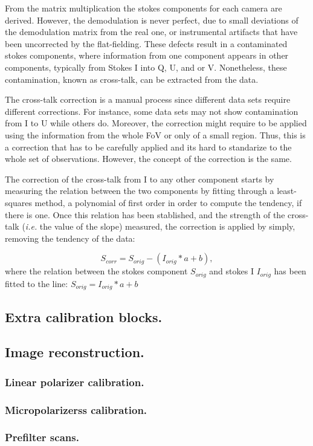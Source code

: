 From the matrix multiplication the stokes components for each camera are derived. However, the demodulation is never perfect, due to small deviations of the demodulation matrix from the real one, or instrumental artifacts that have been uncorrected by the flat-fielding. These defects result in a contaminated stokes components, where information from one component appears in other components, typically from Stokes I into Q, U, and or V. Nonetheless, these contamination, known as cross-talk, can be extracted from the data. 

The cross-talk correction is a manual process since different data sets require different corrections. For instance, some data sets may not show contamination from I to U while others do. Moreover, the correction might require to be applied using the information from the whole FoV or only of a small region. Thus, this is a correction that has to be carefully applied and its hard to standarize to the whole set of observations. However, the concept of the correction is the same. 

The correction of the cross-talk from I to any other component starts by measuring the relation between the two components by fitting through a least-squares method, a polynomial of first order in order to compute the tendency, if there is one. Once this relation has been stablished, and the strength of the cross-talk (\textit{i.e.} the value of the slope) measured, the correction is applied by simply, removing the tendency of the data: 

\begin{equation}
  S_{corr} = S_{orig} - (I_{orig} * a + b),
\end{equation}
where the relation between the stokes component $S_{orig}$ and stokes I $I_{orig}$ has been fitted to the line: $S_{orig} =  I_{orig} * a + b$

\subsection{Extra calibration blocks.}

\subsection{Image reconstruction.}
\subsubsection{Linear polarizer calibration.}
\subsubsection{Micropolarizerss calibration.}
\subsubsection{Prefilter scans.}

